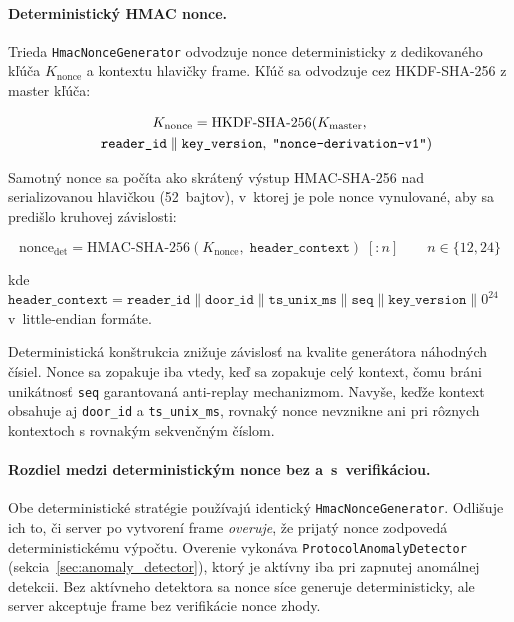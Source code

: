 \paragraph{Deterministický HMAC nonce.}
Trieda \texttt{HmacNonceGenerator} odvodzuje nonce deterministicky z dedikovaného kľúča $K_{\text{nonce}}$ a kontextu hlavičky frame. Kľúč sa odvodzuje cez HKDF-SHA-256 z master kľúča:

\begin{multline}
K_{\text{nonce}} = \text{HKDF-SHA-256}(K_{\text{master}},\\
\quad \texttt{reader\_id} \parallel \texttt{key\_version},\; \text{\texttt{\char34 nonce-derivation-v1\char34}})
\end{multline}

Samotný nonce sa počíta ako skrátený výstup HMAC-SHA-256 nad serializovanou hlavičkou (52~bajtov), v~ktorej je pole nonce vynulované, aby sa predišlo kruhovej závislosti:

\begin{equation}
\text{nonce}_{\text{det}} = \text{HMAC-SHA-256}(K_{\text{nonce}},\; \texttt{header\_context})\;[:n] \qquad n \in \{12, 24\}
\end{equation}

kde $\texttt{header\_context} = \texttt{reader\_id} \parallel \texttt{door\_id} \parallel \texttt{ts\_unix\_ms} \parallel \texttt{seq} \parallel \texttt{key\_version} \parallel 0^{24}$ v~little-endian formáte.

Deterministická konštrukcia znižuje závislosť na kvalite generátora náhodných čísiel\cite{BellareNonceMisuse2006}. Nonce sa zopakuje iba vtedy, keď sa zopakuje celý kontext, čomu bráni unikátnosť \texttt{seq} garantovaná anti-replay mechanizmom. Navyše, keďže kontext obsahuje aj \texttt{door\_id} a \texttt{ts\_unix\_ms}, rovnaký nonce nevznikne ani pri rôznych kontextoch s rovnakým sekvenčným číslom.

\paragraph{Rozdiel medzi deterministickým nonce bez a~s~verifikáciou.}
Obe deterministické stratégie používajú identický \texttt{HmacNonceGenerator}. Odlišuje ich to, či server po vytvorení frame \emph{overuje}, že prijatý nonce zodpovedá deterministickému výpočtu. Overenie vykonáva \texttt{ProtocolAnomalyDetector} (sekcia~\ref{sec:anomaly_detector}), ktorý je aktívny iba pri zapnutej anomálnej detekcii. Bez aktívneho detektora sa nonce síce generuje deterministicky, ale server akceptuje frame bez verifikácie nonce zhody.

